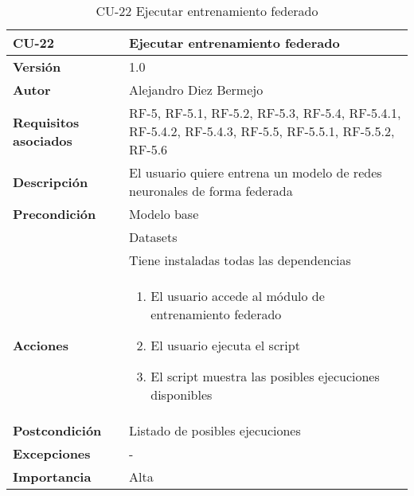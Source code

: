 \begin{table}[p]
	\centering
	\begin{tabularx}{\linewidth}{ p{} p{} }
		\toprule
		\textbf{CU-22}    & \textbf{Ejecutar entrenamiento federado}\\
		\toprule
		\textbf{Versión}              & 1.0    \\
		\textbf{Autor}                & Alejandro Diez Bermejo \\
		\textbf{Requisitos asociados} & RF-5, RF-5.1, RF-5.2, RF-5.3, RF-5.4, RF-5.4.1, RF-5.4.2, RF-5.4.3, RF-5.5, RF-5.5.1, RF-5.5.2, RF-5.6 \\
		\textbf{Descripción}          & El usuario quiere entrena un modelo de redes neuronales de forma federada \\
        \textbf{Precondición}         & Modelo base \\
                                      & Datasets \\
                                      & Tiene instaladas todas las dependencias \\
		\textbf{Acciones}             &
		\begin{enumerate}
			\def\labelenumi{\arabic{enumi}.}
			\tightlist
            \item El usuario accede al módulo de entrenamiento federado
            \item El usuario ejecuta el script
            \item El script muestra las posibles ejecuciones disponibles
		\end{enumerate}\\
		\textbf{Postcondición}        & Listado de posibles ejecuciones \\
		\textbf{Excepciones}          & - \\
		\textbf{Importancia}          & Alta \\
		\bottomrule
	\end{tabularx}
	\caption{CU-22 Ejecutar entrenamiento federado}
\end{table}

